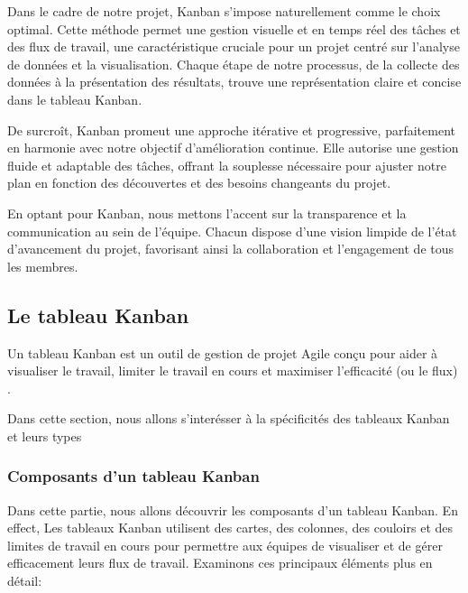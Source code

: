 \par Dans le cadre de notre projet, Kanban s'impose naturellement comme le choix optimal. 
Cette méthode permet une gestion visuelle et en temps réel des tâches et des flux de travail, une caractéristique cruciale pour un projet centré sur l'analyse de données et la visualisation.
 Chaque étape de notre processus, de la collecte des données à la présentation des résultats, trouve une représentation claire et concise dans le tableau Kanban.

\par De surcroît, Kanban promeut une approche itérative et progressive, parfaitement en harmonie avec notre objectif d'amélioration continue. 
Elle autorise une gestion fluide et adaptable des tâches, offrant la souplesse nécessaire pour ajuster notre plan en fonction des découvertes et des besoins changeants du projet.
\par En optant pour Kanban, nous mettons l'accent sur la transparence et la communication au sein de l'équipe. 
Chacun dispose d'une vision limpide de l'état d'avancement du projet, favorisant ainsi la collaboration et l'engagement de tous les membres.
\subsection{Le tableau Kanban}
\par Un tableau Kanban est un outil de gestion de projet Agile conçu pour aider à visualiser le travail, limiter le travail en cours et maximiser l'efficacité (ou le flux) \cite{kanban}.
\par Dans cette section, nous allons s'interésser à la spécificités des tableaux Kanban et leurs types

\subsubsection{Composants d'un tableau Kanban}
\par Dans cette partie, nous allons découvrir les composants d'un tableau Kanban. En effect, Les tableaux Kanban utilisent des cartes, des colonnes, des couloirs et des limites de travail 
en cours pour permettre aux équipes de visualiser et de gérer efficacement leurs flux de travail. Examinons ces principaux éléments plus en détail:

